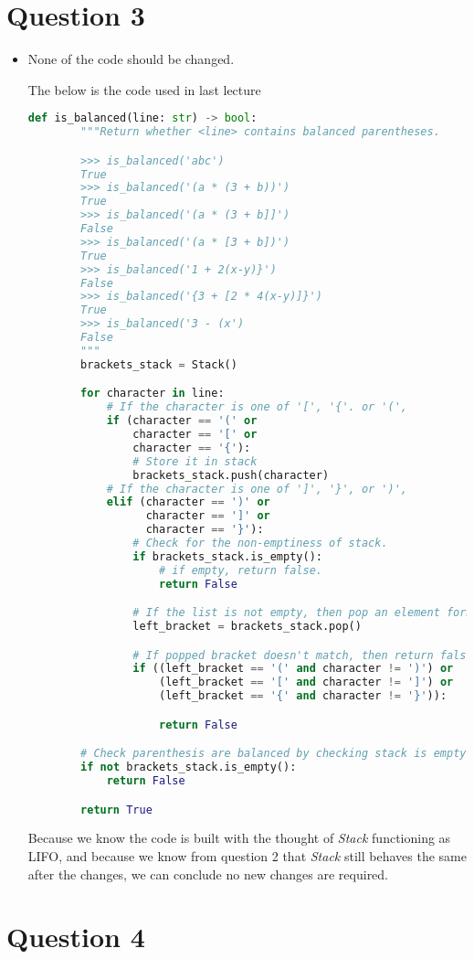 \documentclass[12pt]{article}
\begin{document}
\section*{Question 3}
\begin{itemize}
    \item

    None of the code should be changed.

    \bigskip

    The below is the code used in last lecture

    \begin{lstlisting}[language=Python,caption={worksheet\_10\_q1b\_solution.py},captionpos=b]
        def is_balanced(line: str) -> bool:
        """Return whether <line> contains balanced parentheses.

        >>> is_balanced('abc')
        True
        >>> is_balanced('(a * (3 + b))')
        True
        >>> is_balanced('(a * (3 + b]]')
        False
        >>> is_balanced('(a * [3 + b])')
        True
        >>> is_balanced('1 + 2(x-y)}')
        False
        >>> is_balanced('{3 + [2 * 4(x-y)]}')
        True
        >>> is_balanced('3 - (x')
        False
        """
        brackets_stack = Stack()

        for character in line:
            # If the character is one of '[', '{'. or '(',
            if (character == '(' or
                character == '[' or
                character == '{'):
                # Store it in stack
                brackets_stack.push(character)
            # If the character is one of ']', '}', or ')',
            elif (character == ')' or
                  character == ']' or
                  character == '}'):
                # Check for the non-emptiness of stack.
                if brackets_stack.is_empty():
                    # if empty, return false.
                    return False

                # If the list is not empty, then pop an element form stack.
                left_bracket = brackets_stack.pop()

                # If popped bracket doesn't match, then return false
                if ((left_bracket == '(' and character != ')') or
                    (left_bracket == '[' and character != ']') or
                    (left_bracket == '{' and character != '}')):

                    return False

        # Check parenthesis are balanced by checking stack is empty.
        if not brackets_stack.is_empty():
            return False

        return True
    \end{lstlisting}

    \bigskip

    Because we know the code is built with the thought of \textit{Stack} functioning
    as LIFO, and because we know from question 2 that \textit{Stack} still behaves
    the same after the changes, we can conclude no new changes are required.

\end{itemize}
\section*{Question 4}
\end{document}
